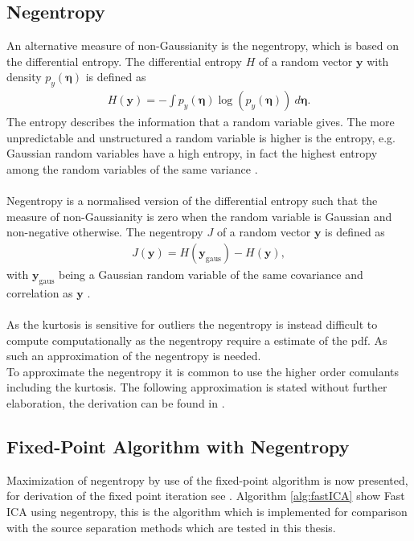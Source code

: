 \subsection{Negentropy}
An alternative measure of non-Gaussianity is the negentropy, which is based on the differential entropy. The differential entropy $H$ of a random vector $\mathbf{y}$ with density $p_y (\boldsymbol{\eta})$ is defined as
\begin{align*}
H(\mathbf{y}) = - \int p_y (\boldsymbol{\eta}) \log (p_y (\boldsymbol{\eta})) \ d\boldsymbol{\eta}.
\end{align*}
The entropy describes the information that a random variable gives. The more unpredictable and unstructured a random variable is higher is the entropy, e.g. Gaussian random variables have a high entropy, in fact the highest entropy among the random variables of the same variance \cite[p. 182]{ICA}.
\\ \\
Negentropy is a normalised version of the differential entropy such that the measure of non-Gaussianity is zero when the random variable is Gaussian and non-negative otherwise. The negentropy $J$ of a random vector $\mathbf{y}$ is defined as 
\begin{align*}
J(\mathbf{y}) = H(\mathbf{y}_{\text{gaus}}) - H(\mathbf{y}),
\end{align*}
with $\mathbf{y}_{\text{gaus}}$ being a Gaussian random variable of the same covariance and correlation as $\mathbf{y}$ \cite[p. 182]{ICA}.
\\ \\
As the kurtosis is sensitive for outliers the negentropy is instead difficult to compute computationally as the negentropy require a estimate of the pdf. As such an approximation of the negentropy is needed.\\

To approximate the negentropy it is common to use the higher order comulants including the kurtosis. The following approximation is stated without further elaboration, the derivation can be found in \cite[p. 182]{ICA}. 

\subsection{Fixed-Point Algorithm with Negentropy}
Maximization of negentropy by use of the fixed-point algorithm is now presented, for derivation of the fixed point iteration see \cite[p. 188]{ICA}. Algorithm \ref{alg:fastICA} show Fast ICA using negentropy, this is the algorithm which is implemented for comparison with the source separation methods which are tested in this thesis.    

